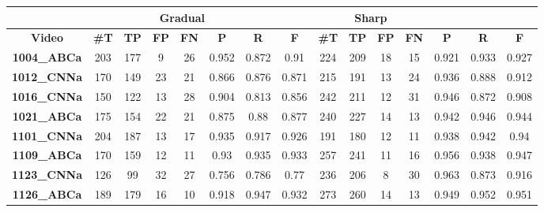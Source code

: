 \documentclass[journal]{IEEEtran}
\begin{document}
\begin{table*}[h]
\centering

\begin{tabular}{|c|c|c|c|c|c|c|c|c|c|c|c|c|c|c|}
\hline
 & \multicolumn{6}{c|}{\textbf{Gradual}} & \multicolumn{6}{c|}{\textbf{Sharp}}  \\ \hline
\textbf{Video}      & \textbf{\#T} & \textbf{TP} & \textbf{FP} & \textbf{FN} & \textbf{P} & \textbf{R} & \textbf{F} & \textbf{\#T} & \textbf{TP} & \textbf{FP} & \textbf{FN} & \textbf{P} & \textbf{R} & \textbf{F} \\ \hline
\textbf{1004\_ABCa} & 203           & 177         & 9           & 26          & 0.952      & 0.872      & 0.91       & 224           & 209         & 18          & 15          & 0.921      & 0.933      & 0.927      \\ \hline
\textbf{1012\_CNNa} & 170           & 149         & 23          & 21          & 0.866      & 0.876      & 0.871      & 215           & 191         & 13          & 24          & 0.936      & 0.888      & 0.912      \\ \hline
\textbf{1016\_CNNa} & 150           & 122         & 13          & 28          & 0.904      & 0.813      & 0.856      & 242           & 211         & 12          & 31          & 0.946      & 0.872      & 0.908      \\ \hline
\textbf{1021\_ABCa} & 175           & 154         & 22          & 21          & 0.875      & 0.88       & 0.877      & 240           & 227         & 14          & 13          & 0.942      & 0.946      & 0.944      \\ \hline
\textbf{1101\_CNNa} & 204           & 187         & 13          & 17          & 0.935      & 0.917      & 0.926      & 191           & 180         & 12          & 11          & 0.938      & 0.942      & 0.94       \\ \hline
\textbf{1109\_ABCa} & 170           & 159         & 12          & 11          & 0.93       & 0.935      & 0.933      & 257           & 241         & 11          & 16          & 0.956      & 0.938      & 0.947      \\ \hline
\textbf{1123\_CNNa} & 126           & 99          & 32          & 27          & 0.756      & 0.786      & 0.77       & 236           & 206         & 8           & 30          & 0.963      & 0.873      & 0.916      \\ \hline
\textbf{1126\_ABCa} & 189           & 179         & 16          & 10          & 0.918      & 0.947      & 0.932      & 273           & 260         & 14          & 13          & 0.949      & 0.952      & 0.951      \\ \hline

\end{tabular}
\end{table*}
\end{document}
